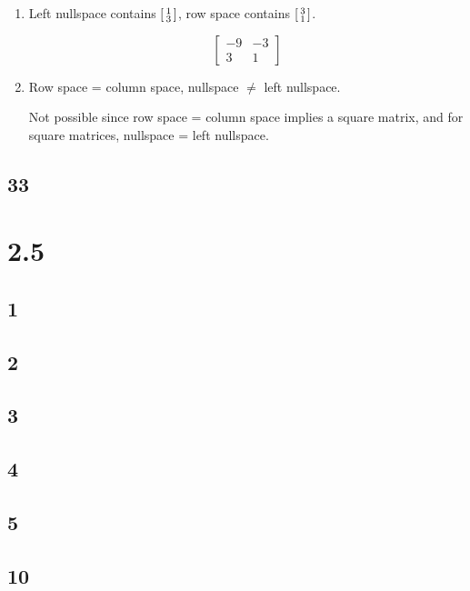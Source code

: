 \documentclass[12pt,letterpaper]{article}
\begin{document}
\begin{enumerate}
        \item
          Left nullspace contains $\begin{bsmallmatrix}1 \\ 3\end{bsmallmatrix}$, row space contains $\begin{bsmallmatrix}3 \\ 1\end{bsmallmatrix}$.

          \[
            \begin{bmatrix}
              -9 & -3 \\
              3 & 1
            \end{bmatrix}
          \]

        \item
          Row space = column space, nullspace $\ne$ left nullspace.

          Not possible since row space = column space implies a square matrix, and for square matrices, nullspace = left nullspace.
      \end{enumerate}
    \subsection*{33}

  \section*{2.5}
    \subsection*{1}
    \subsection*{2}
    \subsection*{3}
    \subsection*{4}
    \subsection*{5}
    \subsection*{10}
\end{document}
